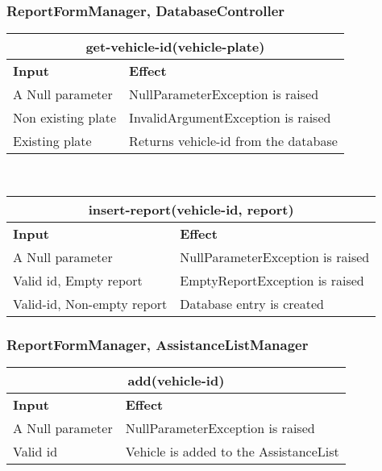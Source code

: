 \subsubsection{ReportFormManager, DatabaseController}
\begin{tabular}{|p{5cm}|p{7cm}|}
\hline
\multicolumn{2}{|c|}{get-vehicle-id(vehicle-plate)} \\
\hline
\textbf{Input} & \textbf{Effect} \\

\hline
A Null parameter & NullParameterException is raised \\

\hline
Non existing plate & InvalidArgumentException is raised \\

\hline
Existing plate & Returns vehicle-id from the database \\
\hline
\end{tabular}
\\
\begin{tabular}{|p{5cm}|p{7cm}|}
\hline
\multicolumn{2}{|c|}{insert-report(vehicle-id, report)} \\
\hline
\textbf{Input} & \textbf{Effect} \\

\hline
A Null parameter & NullParameterException is raised \\

\hline
Valid id, Empty report & EmptyReportException is raised \\

\hline
Valid-id, Non-empty report & Database entry is created \\
\hline
\end{tabular}

\subsubsection{ReportFormManager, AssistanceListManager}
\begin{tabular}{|p{5cm}|p{7cm}|}
\hline
\multicolumn{2}{|c|}{add(vehicle-id)} \\
\hline
\textbf{Input} & \textbf{Effect} \\

\hline
A Null parameter & NullParameterException is raised \\

\hline
Valid id & Vehicle is added to the AssistanceList \\
\hline
\end{tabular}
